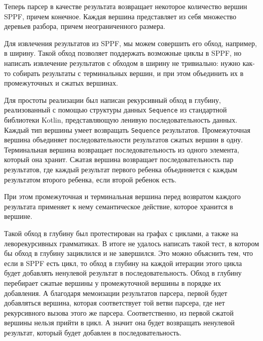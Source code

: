 Теперь парсер в качестве результата возвращает некоторое количество вершин SPPF, причем конечное. Каждая вершина представляет из себя множество деревьев разбора, причем неограниченного размера.

Для извлечения результатов из SPPF, мы можем совершить его обход, например, в ширину. Такой обход позволяет поддержать возможные циклы в SPPF, но написать извлечение результатов с обходом в ширину не тривиально: нужно как-то собирать результаты с терминальных вершин, и при этом объединить их в промежуточных и сжатых вершинах. 

Для простоты реализации был написан рекурсивный обход в глубину, реализованный с помощью структуры данных \texttt{Sequence} из стандартной библиотеки Kotlin, представляющую ленивую последовательность данных. Каждый тип вершины умеет возвращать \texttt{Sequence} результатов. Промежуточная вершина объединяет последовательности результатов сжатых вершин в одну. Терминальная вершина возвращает последовательность из одного элемента, который она хранит. Сжатая вершина возвращает последовательность пар результатов, где каждый результат первого ребенка объединяется с каждым результатом второго ребенка, если второй ребенок есть. 

При этом промежуточная и терминальная вершина перед возвратом каждого результата применяет к нему семантическое действие, которое хранится в вершине. 

Такой обход в глубину был протестирован на графах с циклами, а также на леворекурсивных грамматиках. В итоге не удалось написать такой тест, в котором бы обход в глубину зациклился и не завершился. Это можно объяснить тем, что если в SPPF есть цикл, то обход в глубину на каждой итерации этого цикла будет добавлять ненулевой результат в последовательность. Обход в глубину перебирает сжатые вершины у промежуточной вершины в порядке их добавления. А благодаря мемоизации результатов парсера, первой будет добавляться вершина, которая соответствует той ветви парсера, где нет рекурсивного вызова этого же парсера. Соответственно, из первой сжатой вершины нельзя прийти в цикл. А значит она будет возвращать ненулевой результат, который будет добавлен в последовательность.

